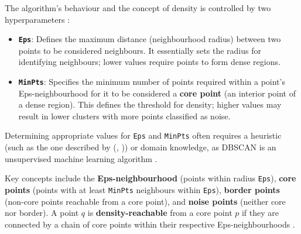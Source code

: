 \documentclass[10pt,oneside]{report}
\renewcommand{\citet}[1]{\citeauthor{#1}, \citeyear{#1}}
\begin{document}
The algorithm's behaviour and the concept of density is controlled by two hyperparameters \cite{ester1996density}:
\begin{itemize}
    \item \textbf{\texttt{Eps}}: Defines the maximum distance (neighbourhood radius) between two points to be considered neighbours. It essentially sets the radius for identifying neighbours; lower values require points to form dense regions.
    \item \textbf{\texttt{MinPts}}: Specifies the minimum number of points required within a point's Eps-neighbourhood for it to be considered a \textbf{core point} (an interior point of a dense region). This defines the threshold for density; higher values may result in lower clusters with more points classified as noise.
\end{itemize}

Determining appropriate values for \texttt{Eps} and \texttt{MinPts} often requires a heuristic (such as the one described by (\citet{ester1996density})) or domain knowledge, as DBSCAN is an unsupervised machine learning algorithm \cite{ester1996density}.


Key concepts include the \textbf{Eps-neighbourhood} (points within radius \texttt{Eps}), \textbf{core points} (points with at least \texttt{MinPts} neighbours within \texttt{Eps}), \textbf{border points} (non-core points reachable from a core point), and \textbf{noise points} (neither core nor border). A point $q$ is \textbf{density-reachable} from a core point $p$ if they are connected by a chain of core points within their respective Eps-neighbourhoods \cite{ester1996density}.
\end{document}
